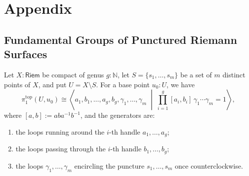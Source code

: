 \documentclass[11pt,letterpaper]{article}
\theoremstyle{numberfirstplain}
\numberwithin{equation}{theorem}
\theoremstyle{numberfirstupright}
\begin{document}
\newpage 
\appendix
{}
\section*{Appendix}

\iffalse
\subsection{Fundamental Groups of Punctured Riemann Surfaces}\label{app:surface-fundamental-groups}

\begin{proposition}\label{prop:surface-fundamental-group}
Let $X:\mathsf{Riem}$ be compact of genus $g:\mathbb N$, let $S=\{s_1,\dots,s_m\}$ be a set of $m$ distinct points of $X$, and put $U=X\setminus S$. For a base point $u_0:U$, we have
\[
\pi_1^{\mathrm{top}}(U,u_0)\cong
\left\langle a_1,b_1,\dots,a_g,b_g,\gamma_1,\dots,\gamma_m
\;\middle|\;
\prod_{i=1}^{g}[a_i,b_i]\,\gamma_1\cdots\gamma_m=1
\right\rangle,
\]
where $[a,b]:=aba^{-1}b^{-1}$, and the generators are:
\begin{enumerate}
  \item the loops running around the $i$-th handle $a_1,\dots,a_g$;
  \item the loops passing through the $i$-th handle $b_1,\dots,b_g$;
  \item the loops $\gamma_1,\dots,\gamma_m$ encircling the puncture $s_1,\dots,s_m$ once counterclockwise.
\end{enumerate}


\end{proposition}
\end{document}
